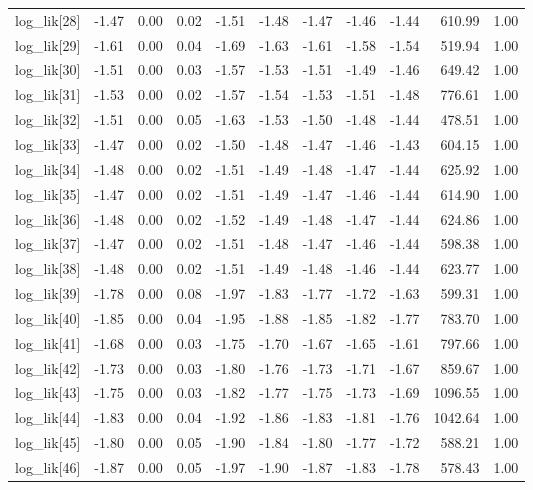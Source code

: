\begin{table}[ht]
\begin{tabular}{rrrrrrrrrrr}
  log\_lik[28] & -1.47 & 0.00 & 0.02 & -1.51 & -1.48 & -1.47 & -1.46 & -1.44 & 610.99 & 1.00 \\ 
  log\_lik[29] & -1.61 & 0.00 & 0.04 & -1.69 & -1.63 & -1.61 & -1.58 & -1.54 & 519.94 & 1.00 \\ 
  log\_lik[30] & -1.51 & 0.00 & 0.03 & -1.57 & -1.53 & -1.51 & -1.49 & -1.46 & 649.42 & 1.00 \\ 
  log\_lik[31] & -1.53 & 0.00 & 0.02 & -1.57 & -1.54 & -1.53 & -1.51 & -1.48 & 776.61 & 1.00 \\ 
  log\_lik[32] & -1.51 & 0.00 & 0.05 & -1.63 & -1.53 & -1.50 & -1.48 & -1.44 & 478.51 & 1.00 \\ 
  log\_lik[33] & -1.47 & 0.00 & 0.02 & -1.50 & -1.48 & -1.47 & -1.46 & -1.43 & 604.15 & 1.00 \\ 
  log\_lik[34] & -1.48 & 0.00 & 0.02 & -1.51 & -1.49 & -1.48 & -1.47 & -1.44 & 625.92 & 1.00 \\ 
  log\_lik[35] & -1.47 & 0.00 & 0.02 & -1.51 & -1.49 & -1.47 & -1.46 & -1.44 & 614.90 & 1.00 \\ 
  log\_lik[36] & -1.48 & 0.00 & 0.02 & -1.52 & -1.49 & -1.48 & -1.47 & -1.44 & 624.86 & 1.00 \\ 
  log\_lik[37] & -1.47 & 0.00 & 0.02 & -1.51 & -1.48 & -1.47 & -1.46 & -1.44 & 598.38 & 1.00 \\ 
  log\_lik[38] & -1.48 & 0.00 & 0.02 & -1.51 & -1.49 & -1.48 & -1.46 & -1.44 & 623.77 & 1.00 \\ 
  log\_lik[39] & -1.78 & 0.00 & 0.08 & -1.97 & -1.83 & -1.77 & -1.72 & -1.63 & 599.31 & 1.00 \\ 
  log\_lik[40] & -1.85 & 0.00 & 0.04 & -1.95 & -1.88 & -1.85 & -1.82 & -1.77 & 783.70 & 1.00 \\ 
  log\_lik[41] & -1.68 & 0.00 & 0.03 & -1.75 & -1.70 & -1.67 & -1.65 & -1.61 & 797.66 & 1.00 \\ 
  log\_lik[42] & -1.73 & 0.00 & 0.03 & -1.80 & -1.76 & -1.73 & -1.71 & -1.67 & 859.67 & 1.00 \\ 
  log\_lik[43] & -1.75 & 0.00 & 0.03 & -1.82 & -1.77 & -1.75 & -1.73 & -1.69 & 1096.55 & 1.00 \\ 
  log\_lik[44] & -1.83 & 0.00 & 0.04 & -1.92 & -1.86 & -1.83 & -1.81 & -1.76 & 1042.64 & 1.00 \\ 
  log\_lik[45] & -1.80 & 0.00 & 0.05 & -1.90 & -1.84 & -1.80 & -1.77 & -1.72 & 588.21 & 1.00 \\ 
  log\_lik[46] & -1.87 & 0.00 & 0.05 & -1.97 & -1.90 & -1.87 & -1.83 & -1.78 & 578.43 & 1.00 \\ 

\end{tabular}
\end{table}

